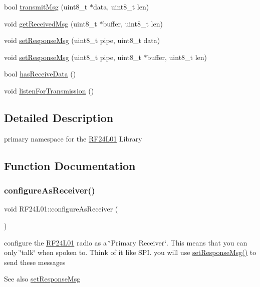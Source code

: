 \begin{DoxyCompactItemize}
\item 
bool \mbox{\hyperlink{namespace_r_f24_l01_a97c2db2a1a441dc1de88f1583861e622}{transmit\+Msg}} (uint8\+\_\+t $\ast$data, uint8\+\_\+t len)
\item 
void \mbox{\hyperlink{namespace_r_f24_l01_af736b8bca2870b8cbf49fda37e1b2b7c}{get\+Received\+Msg}} (uint8\+\_\+t $\ast$buffer, uint8\+\_\+t len)
\item 
void \mbox{\hyperlink{namespace_r_f24_l01_a909555c7340573af8f698610b9cfe497}{set\+Response\+Msg}} (uint8\+\_\+t pipe, uint8\+\_\+t data)
\item 
void \mbox{\hyperlink{namespace_r_f24_l01_a19a402017e07bee1a0191e5cff84f1ca}{set\+Response\+Msg}} (uint8\+\_\+t pipe, uint8\+\_\+t $\ast$buffer, uint8\+\_\+t len)
\item 
bool \mbox{\hyperlink{namespace_r_f24_l01_ac87aab075d5fd63ba4cd99daa1b34d33}{has\+Receive\+Data}} ()
\item 
void \mbox{\hyperlink{namespace_r_f24_l01_a67f6d1410d0de10ae0f6e9a5a8c58760}{listen\+For\+Transmission}} ()
\end{DoxyCompactItemize}


\subsection{Detailed Description}
primary namespace for the \mbox{\hyperlink{namespace_r_f24_l01}{R\+F24\+L01}} Library 

\subsection{Function Documentation}
\mbox{\label{namespace_r_f24_l01_ac6a39c4cfff9cf552bb772a264cc9a8c}} 
\subsubsection{\texorpdfstring{configure\+As\+Receiver()}{configureAsReceiver()}}
{\footnotesize\ttfamily void R\+F24\+L01\+::configure\+As\+Receiver (\begin{DoxyParamCaption}{ }\end{DoxyParamCaption})}

configure the \mbox{\hyperlink{namespace_r_f24_l01}{R\+F24\+L01}} radio as a \char`\"{}\+Primary Receiver\char`\"{}. This means that you can only \char`\"{}talk\char`\"{} when spoken to. Think of it like S\+PI. you will use \mbox{\hyperlink{namespace_r_f24_l01_a909555c7340573af8f698610b9cfe497}{set\+Response\+Msg()}} to send these messages \begin{DoxySeeAlso}{See also}
\mbox{\hyperlink{namespace_r_f24_l01_a909555c7340573af8f698610b9cfe497}{set\+Response\+Msg}} 
\end{DoxySeeAlso}
\mbox{\label{namespace_r_f24_l01_a38352628295b6668087802280e1c1eb9}} 
